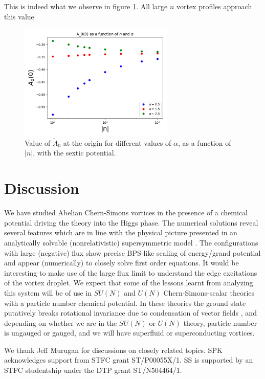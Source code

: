 \ee
This is indeed what we observe in figure \ref{A0sextic}. All large $n$ vortex profiles approach this value
\begin{figure}[h]
\begin{center}
 \includegraphics[width=2.9in]{Chapter_2_Folder_1912.11321/figures/sixth_order_A0.pdf}     \caption{{ \small Value of $\tilde A_0$ at the origin for different values of $\alpha$, as a function of $|n|$,  
 with the sextic potential.}} \label{A0sextic}
    \end{center}
\end{figure}
\section{Discussion}
We have studied Abelian Chern-Simons vortices in the presence of a chemical potential driving the theory into the Higgs phase. The numerical solutions reveal several features which are in line with the physical picture presented in an analytically solvable (nonrelativistic) supersymmetric model \cite{Tong:2015xaa, Tong:2003vy}.  The configurations with large (negative) flux show precise BPS-like scaling of energy/grand potential and appear (numerically) to closely solve first order equations.
It would be interesting to make use of the large flux limit to understand the edge excitations of the vortex droplet. We expect that some of the lessons learnt from analyzing this system will be of use in $SU(N)$ and $U(N)$ Chern-Simons-scalar theories with a particle number chemical potential. In these theories the ground state putatively breaks rotational invariance due to condensation of vector fields \cite{Kumar:2018nkf}, and depending on whether we are in the $SU(N)$ or $U(N)$ theory, particle number is ungauged or gauged,  and we will have superfluid or superconducting vortices. 

\acknowledgments We thank Jeff Murugan for discussions on closely related topics. SPK acknowledges support from STFC grant ST/P00055X/1. SS is supported by an STFC studentship under the DTP grant ST/N504464/1.


